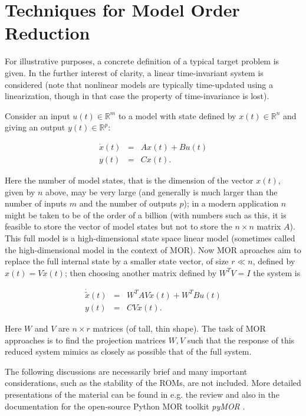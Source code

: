 \section{Techniques for Model Order Reduction} \label{MORTechniques}

For illustrative purposes, a concrete definition of a typical target problem is given.  
In the further interest of clarity, a linear time-invariant system is considered (note that nonlinear models are typically time-updated using a linearization, though in that case the property of time-invariance is lost).

Consider an input $u(t) \in \mathbb{R}^m$ to a model with state defined by $x(t) \in \mathbb{R}^n$ and giving an output $y(t) \in \mathbb{R}^p$:

\begin{eqnarray} \label{LTIsystem}
\dot{x}(t) &=& A x(t) + B u(t)\\
y(t) &=& C x(t).
\end{eqnarray}

Here the number of model states, that is the dimension of the vector $x(t)$, given by $n$ above, may be very large (and generally is much larger than the number of inputs $m$ and the number of outputs $p$); in a modern application $n$ might be taken to be of the order of a billion (with numbers such as this, it is feasible to store the vector of model states but not to store the $n \times n$ matrix $A$).  
This full model is a high-dimensional state space linear model (sometimes called the high-dimensional model in the context of MOR).  
Now MOR aproaches aim to replace the full internal state by a smaller state vector, of size $r \ll n$, defined by $x(t) = V \tilde{x}(t)$; then choosing another matrix defined by $W^T V = I$ the system is 

\begin{eqnarray}
\dot{\tilde{x}}(t) &=& W^T A V \tilde{x}(t) + W^T B u(t)\\
y(t) &=& C V \tilde{x}(t).
\end{eqnarray}

Here $W$ and $V$ are $n \times r$ matrices (of tall, thin shape).  
The task of MOR approaches is to find the projection matrices $W, V$ such that the response of this reduced system mimics as closely as possible that of the full system.

The following discussions are necessarily brief and many important considerations, such as the stability of the ROMs, are not included.  
More detailed presentations of the material can be found in e.g. the review \cite{ch17mode} and also in the documentation for the open-source Python MOR toolkit {\it pyMOR} \cite{pymorwebsite}.

